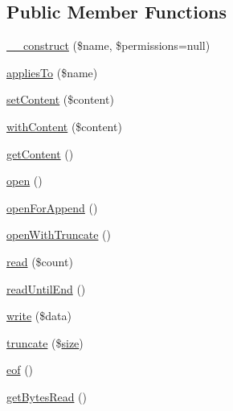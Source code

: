 \subsection*{Public Member Functions}
\begin{DoxyCompactItemize}
\item 
\mbox{\hyperlink{classorg_1_1bovigo_1_1vfs_1_1vfs_stream_file_acb8ea4ab5eedb93ea03a6628f5915f04}{\+\_\+\+\_\+construct}} (\$name, \$permissions=null)
\item 
\mbox{\hyperlink{classorg_1_1bovigo_1_1vfs_1_1vfs_stream_file_a1769b12aee6e9730bcf9b56703eb6a03}{applies\+To}} (\$name)
\item 
\mbox{\hyperlink{classorg_1_1bovigo_1_1vfs_1_1vfs_stream_file_a04a5eddb7c3abc7bf31fa25b58f046bf}{set\+Content}} (\$content)
\item 
\mbox{\hyperlink{classorg_1_1bovigo_1_1vfs_1_1vfs_stream_file_a02f4f68a56cc7695c22739e95a8b785c}{with\+Content}} (\$content)
\item 
\mbox{\hyperlink{classorg_1_1bovigo_1_1vfs_1_1vfs_stream_file_a58e43f09a06ce4e29b192c4e17ce7915}{get\+Content}} ()
\item 
\mbox{\hyperlink{classorg_1_1bovigo_1_1vfs_1_1vfs_stream_file_a44a2ac59a3b91f8c18905dce700934d6}{open}} ()
\item 
\mbox{\hyperlink{classorg_1_1bovigo_1_1vfs_1_1vfs_stream_file_abce6fe16b86a5868f14f1f27a85aedd8}{open\+For\+Append}} ()
\item 
\mbox{\hyperlink{classorg_1_1bovigo_1_1vfs_1_1vfs_stream_file_a97b92f1b5edefe769e3a33e6b0daf3bc}{open\+With\+Truncate}} ()
\item 
\mbox{\hyperlink{classorg_1_1bovigo_1_1vfs_1_1vfs_stream_file_aa71d90344248b49a193c5fad56cbe754}{read}} (\$count)
\item 
\mbox{\hyperlink{classorg_1_1bovigo_1_1vfs_1_1vfs_stream_file_a5d3b1ac4d705f2b94ac4233353efa8c1}{read\+Until\+End}} ()
\item 
\mbox{\hyperlink{classorg_1_1bovigo_1_1vfs_1_1vfs_stream_file_a85013b0dcf138f6997e2a05332ed0dd5}{write}} (\$data)
\item 
\mbox{\hyperlink{classorg_1_1bovigo_1_1vfs_1_1vfs_stream_file_a1622693a343bd0e33572355ac7001f72}{truncate}} (\$\mbox{\hyperlink{classorg_1_1bovigo_1_1vfs_1_1vfs_stream_file_a775bfb88c1bb7975d67f277eade2a1b7}{size}})
\item 
\mbox{\hyperlink{classorg_1_1bovigo_1_1vfs_1_1vfs_stream_file_ada3799f740f09e3689d0054629e87feb}{eof}} ()
\item 
\mbox{\hyperlink{classorg_1_1bovigo_1_1vfs_1_1vfs_stream_file_aa05e9588ede58b8e3b6b82a684a0337b}{get\+Bytes\+Read}} ()

\end{DoxyCompactItemize}
